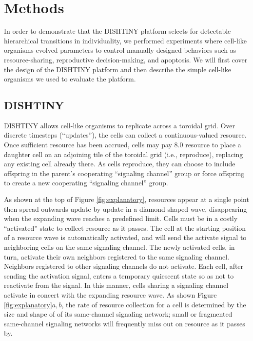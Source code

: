 \section{Methods}

In order to demonstrate that the DISHTINY platform selects for detectable hierarchical transitions in individuality, we performed experiments where cell-like organisms evolved parameters to control manually designed behaviors such as resource-sharing, reproductive decision-making, and apoptosis.
We will first cover the design of the DISHTINY platform and then describe the simple cell-like organisms we used to evaluate the platform.

\subsection{DISHTINY}



DISHTINY allows cell-like organisms to replicate across a toroidal grid.
Over discrete timesteps (``updates''), the cells can collect a continuous-valued resource.
Once sufficient resource has been accrued, cells may pay $8.0$ resource to place a daughter cell on an adjoining tile of the toroidal grid (i.e., reproduce), replacing any existing cell already there.
As cells reproduce, they can choose to include offspring in the parent's cooperating ``signaling channel'' group or force offspring to create a new cooperating ``signaling channel'' group.

As shown at the top of Figure \ref{fig:explanatory}, resources appear at a single point then spread outwards update-by-update in a diamond-shaped wave, disappearing when the expanding wave reaches a predefined limit.
Cells must be in a costly ``activated'' state to collect resource as it passes.
The cell at the starting position of a resource wave is automatically activated, and will send the activate signal to neighboring cells on the same signaling channel.
The newly activated cells, in turn, activate their own neighbors registered to the same signaling channel.
Neighbors registered to other signaling channels do not activate.
Each cell, after sending the activation signal, enters a temporary quiescent state so as not to reactivate from the signal.
In this manner, cells sharing a signaling channel activate in concert with the expanding resource wave.
As shown Figure \ref{fig:explanatory}$a,b$, the rate of resource collection for a cell is determined by the size and shape of of its same-channel signaling network;
small or fragmented same-channel signaling networks will frequently miss out on resource as it passes by.

